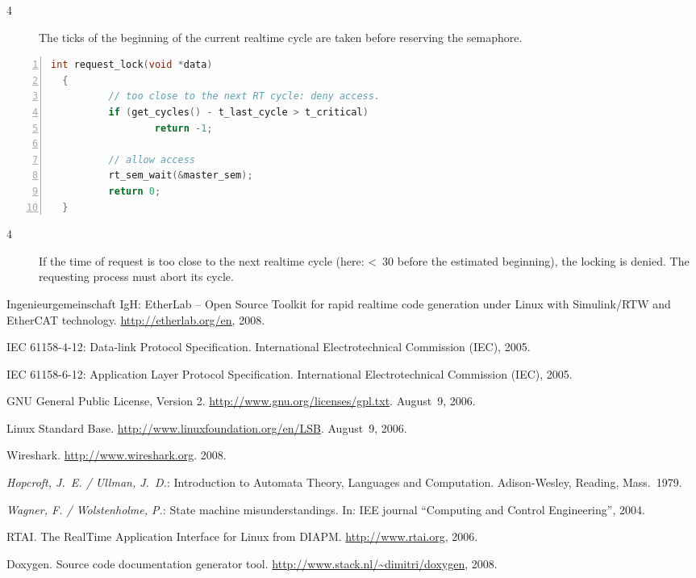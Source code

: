 \documentclass[a4paper,12pt,BCOR6mm,bibtotoc,idxtotoc]{scrbook}
\renewcommand\nomname{Glossary}
\newcommand{\linenum}[1]{\normalfont\textcircled{\tiny #1}}
\begin{document}
\begin{description}
\item[\linenum{4}] The ticks of the beginning of
  the current realtime cycle are taken before reserving the semaphore.
\end{description}

\begin{lstlisting}[gobble=2,language=C,numbers=left,caption={Request callback
    for reduced jitter},label={lst:redreq}]
  int request_lock(void *data)
  {
          // too close to the next RT cycle: deny access.
          if (get_cycles() - t_last_cycle > t_critical)
                  return -1;

          // allow access
          rt_sem_wait(&master_sem);
          return 0;
  }
\end{lstlisting}

\begin{description}

\item[\linenum{4}] If the time of request is too close to the next realtime
cycle (here: \unit{<30}{\micro\second} before the estimated beginning), the
locking is denied. The requesting process must abort its cycle.

\end{description}


\begin{thebibliography}{99}

 Ingenieurgemeinschaft IgH: EtherLab -- Open Source Toolkit
for rapid realtime code generation under Linux with Simulink/RTW and EtherCAT
technology. \url{http://etherlab.org/en}, 2008.

 IEC 61158-4-12: Data-link Protocol Specification.
International Electrotechnical Commission (IEC), 2005.

 IEC 61158-6-12: Application Layer Protocol Specification.
International Electrotechnical Commission (IEC), 2005.

 GNU General Public License, Version 2.
\url{http://www.gnu.org/licenses/gpl.txt}. August~9, 2006.

 Linux Standard Base.
\url{http://www.linuxfoundation.org/en/LSB}.  August~9, 2006.

 Wireshark. \url{http://www.wireshark.org}. 2008.

 {\it Hopcroft, J.~E. / Ullman, J.~D.}: Introduction to
Automata Theory, Languages and Computation. Adison-Wesley, Reading,
Mass.~1979.

 {\it Wagner, F. / Wolstenholme, P.}: State machine
misunderstandings. In: IEE journal ``Computing and Control Engineering'',
2004.

 RTAI. The RealTime Application Interface for Linux from DIAPM.
\url{http://www.rtai.org}, 2006.

 Doxygen. Source code documentation generator tool.
\url{http://www.stack.nl/~dimitri/doxygen}, 2008.

\end{thebibliography}

\printnomenclature
\addcontentsline{toc}{chapter}{\nomname}
\markleft{\nomname}

\printindex
{}

\end{document}
